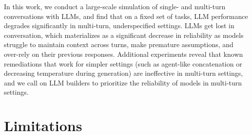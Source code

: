 \documentclass{article}
\begin{document}
In this work, we conduct a large-scale simulation of single- and multi-turn conversations with LLMs, and find that on a fixed set of tasks, LLM performance degrades significantly in multi-turn, underspecified settings. LLMs get lost in conversation, which materializes as a significant decrease in reliability as models struggle to maintain context across turns, make premature assumptions, and over-rely on their previous responses. Additional experiments reveal that known remediations that work for simpler settings (such as agent-like concatenation or decreasing temperature during generation) are ineffective in multi-turn settings, and we call on LLM builders to prioritize the reliability of models in multi-turn settings.


\section{Limitations} \label{sec:limitations}
\end{document}
